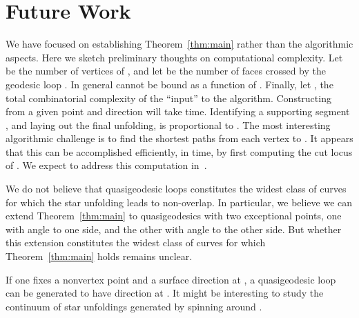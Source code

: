 \pdfoutput=1  \documentclass[]{article}
\newcommand{\thmref}[1]{\ref{thm:#1}}
\begin{document}
\section{Future Work}
We have focused on establishing Theorem~\thmref{main} rather than the algorithmic
aspects.  Here we sketch preliminary thoughts on computational complexity.
Let  be the number of vertices of , and
let  be the number of faces crossed by the
geodesic loop .
In general  cannot be bound as a function of .
Finally, let , the total combinatorial complexity
of the ``input'' to the algorithm.
Constructing  from a given point and direction will
take  time.
Identifying a supporting segment , and laying out the final
unfolding, is proportional to .
The most interesting algorithmic challenge is to find the shortest
paths from each vertex  to .
It appears that this can be accomplished efficiently,
in  time, by first computing the cut locus of .
We expect to address this computation in~\cite{iov-ucpqsu-08b}.

We do not believe that quasigeodesic loops constitutes the widest class of
curves for which the star unfolding leads to non-overlap.
In particular, we believe we can extend
Theorem~\thmref{main} to
quasigeodesics with two exceptional points, one with angle 
to one side, and the other with angle  to the other side.
But whether this extension constitutes the widest class of curves for which
Theorem~\thmref{main} holds remains unclear. 

If one fixes a nonvertex point  and a surface direction  
at , a quasigeodesic loop 
can be generated to have direction  at .
It might be interesting to study the continuum of star unfoldings 
generated by spinning  around .
\end{document}
